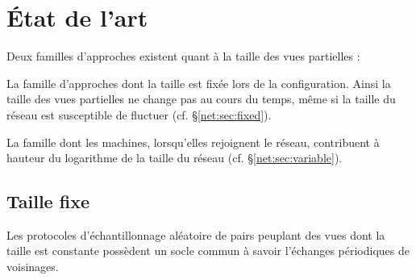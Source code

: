 
\section{État de l'art}
\label{net:sec:stateoftheart}
Deux familles d'approches existent quant à la taille des vues partielles :
\begin{inparaenum}[(i)]
\item La famille d'approches dont la taille est fixée lors de la
  configuration. Ainsi la taille des vues partielles ne change pas au cours du
  temps, même si la taille du réseau est susceptible de fluctuer
  (cf. §\ref{net:sec:fixed}).
\item La famille dont les machines, lorsqu'elles rejoignent le réseau,
  contribuent à hauteur du logarithme de la taille du réseau
  (cf. §\ref{net:sec:variable}).
\end{inparaenum}

\subsection{Taille fixe}
\label{net:subsec:fixed}

Les protocoles d'échantillonnage aléatoire de pairs peuplant des vues dont la
taille est constante possèdent un socle commun à savoir l'échanges périodiques
de voisinages.

